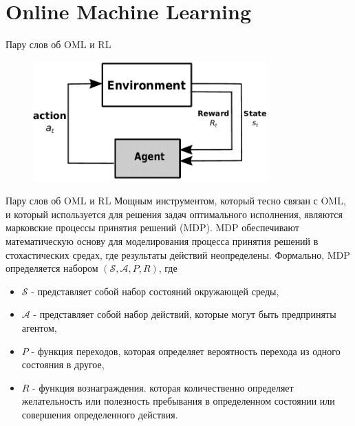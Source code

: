 \documentclass[aspectratio=169]{beamer}
\begin{document}
    \section{Online Machine Learning}

        \begin{frame}{Пару слов об OML и RL}
            \begin{figure}
                \includegraphics[width=0.8\textwidth]{Reinforcement-Learning-Agent-and-Environment}
            \end{figure}
        \end{frame}

        \begin{frame}{Пару слов об OML и RL}
            Мощным инструментом, который тесно связан с OML, и который используется для решения задач оптимального исполнения, являются марковские процессы принятия решений (MDP). MDP обеспечивают математическую основу для моделирования процесса принятия решений в стохастических средах, где результаты действий неопределены.
            Формально, MDP определяется набором $(\mathcal S, \mathcal A, P, R)$, где
        
            \begin{itemize}
        
                \item $\mathcal S$ - представляет собой набор состояний окружающей среды,
                
                \item $\mathcal A$ - представляет собой набор действий, которые могут быть предприняты агентом,
        
                \item $P$ - функция переходов, которая определяет вероятность перехода из одного состояния в другое,
        
                \item $R$ - функция вознаграждения. которая количественно определяет желательность или полезность пребывания в определенном состоянии или совершения определенного действия.
            \end{itemize}
        
        \end{frame}
\end{document}
